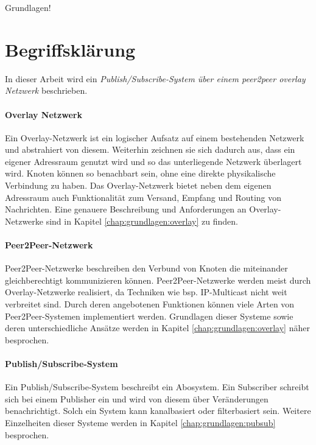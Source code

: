 Grundlagen!
\section{Begriffsklärung}
In dieser Arbeit wird ein \emph{Publish/Subscribe-System über einem peer2peer overlay Netzwerk} beschrieben.

\paragraph{Overlay Netzwerk} Ein Overlay-Netzwerk ist ein logischer Aufsatz auf einem bestehenden Netzwerk und abstrahiert von diesem. Weiterhin zeichnen sie sich dadurch aus, dass ein eigener Adressraum genutzt wird und so das unterliegende Netzwerk überlagert wird. Knoten können so benachbart sein, ohne eine direkte physikalische Verbindung zu haben. Das Overlay-Netzwerk bietet neben dem eigenen Adressraum auch Funktionalität zum Versand, Empfang und Routing von Nachrichten. Eine genauere Beschreibung und Anforderungen an Overlay-Netzwerke sind in Kapitel \ref{chap:grundlagen:overlay} zu finden.


\paragraph{Peer2Peer-Netzwerk} Peer2Peer-Netzwerke beschreiben den Verbund von Knoten die miteinander gleichberechtigt kommunizieren können. Peer2Peer-Netzwerke werden meist durch Overlay-Netzwerke realisiert, da Techniken wie bsp. IP-Multicast nicht weit verbreitet sind. Durch deren angebotenen Funktionen können viele Arten von Peer2Peer-Systemen implementiert werden. Grundlagen dieser Systeme sowie deren unterschiedliche Ansätze werden in Kapitel \ref{chap:grundlagen:overlay} näher besprochen.


\paragraph{Publish/Subscribe-System} Ein Publish/Subscribe-System beschreibt ein Abosystem. Ein Subscriber schreibt sich bei einem Publisher ein und wird von diesem über Veränderungen benachrichtigt. Solch ein System kann kanalbasiert oder filterbasiert sein. Weitere Einzelheiten dieser Systeme werden in Kapitel \ref{chap:grundlagen:pubsub} besprochen.





